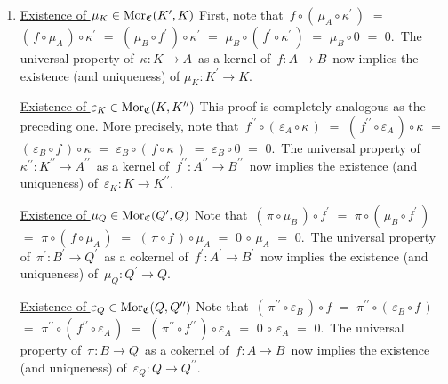 \begin{enumerate}
\item
	\underline{Existence of $\mu_{K} \in \textnormal{Mor}_{\mathfrak{C}}(K^{\prime},K)$}
	\vskip -0.01cm
	First, note that
	\,$f \circ (\,\mu_{A} \circ \kappa^{\prime}\,)$
	\;$=$\; $(\,f \circ \mu_{A}\,)\circ \kappa^{\prime}$
	\;$=$\; $(\,\mu_{B}\circ f^{\prime}\,) \circ \kappa^{\prime}$
	\;$=$\; $\mu_{B} \circ (\,f^{\prime} \circ \kappa^{\prime}\,)$
	\;$=$\; $\mu_{B} \circ 0$
	\;$=$\; $0$.\,
	The universal property of
	\,$\kappa : K \longrightarrow A$\,
	as a kernel of
	\,$f : A \longrightarrow B$\,
	now implies the existence (and uniqueness) of $\mu_{K} : K^{\prime} \longrightarrow K$.
	\vskip 0.3cm

	\underline{Existence of $\varepsilon_{K} \in \textnormal{Mor}_{\mathfrak{C}}(K,K^{\prime\prime})$}
	\vskip -0.01cm
	This proof is completely analogous as the preceding one.
	More precisely, note that
	\,$f^{\prime\prime} \circ (\,\varepsilon_{A} \circ \kappa\,)$
	\;$=$\; $(\,f^{\prime\prime} \circ \varepsilon_{A}\,)\circ \kappa$
	\;$=$\; $(\,\varepsilon_{B} \circ f\,) \circ \kappa$
	\;$=$\; $\varepsilon_{B} \circ (\,f \circ \kappa\,)$
	\;$=$\; $\varepsilon_{B} \circ 0$
	\;$=$\; $0$.\,
	The universal property of
	\,$\kappa^{\prime\prime} : K^{\prime\prime} \longrightarrow A^{\prime\prime}$\,
	as a kernel of
	\,$f^{\prime\prime} : A^{\prime\prime} \longrightarrow B^{\prime\prime}$\,
	now implies the existence (and uniqueness) of
	\,$\varepsilon_{K} : K \longrightarrow K^{\prime\prime}$.
	\vskip 0.3cm

	\underline{Existence of $\mu_{Q} \in \textnormal{Mor}_{\mathfrak{C}}(Q^{\prime},Q)$}
	\vskip -0.01cm
	Note that
	\,$(\,\pi \circ \mu_{B}\,) \circ f^{\prime}$
	\;$=$\; $\pi \circ (\,\mu_{B} \circ f^{\prime}\,)$
	\;$=$\; $\pi \circ (\,f \circ \mu_{A}\,)$
	\;$=$\; $(\,\pi \circ f\,) \circ \mu_{A}$
	\;$=$\; $0 \,\circ\, \mu_{A}$
	\;$=$\; $0$.\,
	The universal property of
	\,$\pi^{\prime} : B^{\prime} \longrightarrow Q^{\prime}$\,
	as a cokernel of
	\,$f^{\prime} : A^{\prime} \longrightarrow B^{\prime}$\,
	now implies the existence (and uniqueness) of
	\,$\mu_{Q} : Q^{\prime} \longrightarrow Q$.
	\vskip 0.3cm

	\underline{Existence of $\varepsilon_{Q} \in \textnormal{Mor}_{\mathfrak{C}}(Q,Q^{\prime\prime})$}
	\vskip -0.01cm
	Note that
	\,$(\,\pi^{\prime\prime} \circ \varepsilon_{B}\,) \circ f$
	\;$=$\; $\pi^{\prime\prime} \circ (\,\varepsilon_{B} \circ f\,)$
	\;$=$\; $\pi^{\prime\prime} \circ (\,f^{\prime\prime} \circ \varepsilon_{A}\,)$
	\;$=$\; $(\,\pi^{\prime\prime} \circ f^{\prime\prime}\,) \circ \varepsilon_{A}$
	\;$=$\; $0 \,\circ\, \varepsilon_{A}$
	\;$=$\; $0$.\,
	The universal property of
	\,$\pi : B \longrightarrow Q$\,
	as a cokernel of
	\,$f : A \longrightarrow B$\,
	now implies the existence (and uniqueness) of
	\,$\varepsilon_{Q} : Q \longrightarrow Q^{\prime\prime}$.
	\vskip 0.5cm


\end{enumerate}
